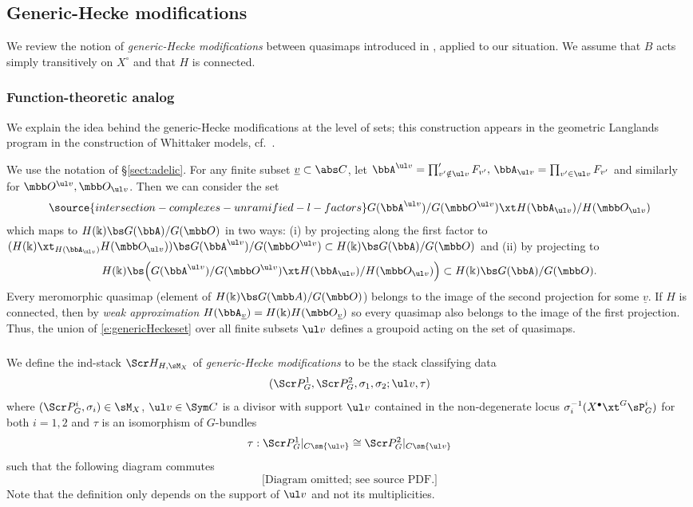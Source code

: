 \subsection{Generic-Hecke modifications}
We review the notion of \emph{generic-Hecke modifications} between quasimaps
introduced in \cite[\S 2.2]{GN}, applied to our situation.
We assume that $B$ acts simply transitively on $X^\circ$ and that $H$ is connected.

\subsubsection{Function-theoretic analog}
We explain the idea behind the generic-Hecke modifications at the level of sets;
this construction appears in the geometric Langlands
program in the construction of Whittaker models, cf.~\cite[\S 5.3.1]{G:outline}.

We use the notation of \S\ref{sect:adelic}.
For any finite subset $\underline v \subset \abs C$,
let $\bbA^{\ul v} = \prod'_{v'\notin \ul v} F_{v'},\,
\bbA_{\ul v} = \prod_{v'\in \ul v} F_{v'}$ and similarly for
$\mbb O^{\ul v}, \mbb O_{\ul v}$. Then we can consider
the set
\begin{equation} \label{e:genericHeckeset}
\source{intersection-complexes-unramified-l-factors}
 G(\bbA^{\ul v})/ G(\mbb O^{\ul v}) \xt H(\bbA_{\ul v})/ H(\mbb O_{\ul v})
\end{equation}
which maps to $H(\Bbbk) \bs G(\bbA) / G(\mbb O)$ in two ways:
(i) by projecting along the first factor to $( H(\Bbbk) \xt_{H(\bbA_{\ul v})} H(\mbb O_{\ul v})) \bs G(\bbA^{\ul v}) / G(\mbb O^{\ul v})
\subset H(\Bbbk) \bs G(\bbA) / G(\mbb O)$
and (ii) by projecting to
\[ H(\Bbbk) \bs \Bigl( G(\bbA^{\ul v}) / G(\mbb O^{\ul v}) \xt H(\bbA_{\ul v})/H(\mbb O_{\ul v}) \Bigr)
\subset H(\Bbbk) \bs G(\bbA)/ G(\mbb O).
\]
Every meromorphic quasimap (element of $H(\Bbbk) \bs G(\mbb A) / G(\mbb O)$)
belongs to the image of the second projection for some
$\underline v$. If $H$ is connected, then by \emph{weak approximation}
$H(\bbA_{\underline v}) = H(\Bbbk) H(\mbb O_{\underline v})$ so
every quasimap also belongs to the image of the first projection.
Thus, the union of \eqref{e:genericHeckeset} over all finite subsets $\ul v$
defines a groupoid acting on the set of quasimaps.


\subsubsection{}
We define the ind-stack $\Scr H_{H,\sM_X}$ of \emph{generic-Hecke modifications}
to be the stack classifying data
\[ (\Scr P^1_G, \Scr P^2_G, \sigma_1,\sigma_2; \ul v, \tau) \]
where $(\Scr P^i_G, \sigma_i) \in \sM_X$,
$\ul v \in \Sym C$ is a divisor with support $\ul v$ contained in the non-degenerate locus
$\sigma_i^{-1}(X^\bullet \xt^G \sP^i_G)$ for both $i=1,2$
and $\tau$ is an isomorphism of $G$-bundles
\[ \tau: \Scr P^1_G|_{C\sm {\ul v}} \cong \Scr P^2_G|_{C\sm {\ul v}} \]
such that the following diagram commutes
\[
\text{[Diagram omitted; see source PDF.]}
\]
Note that the definition only depends on the support of $\ul v$ and not its multiplicities.

